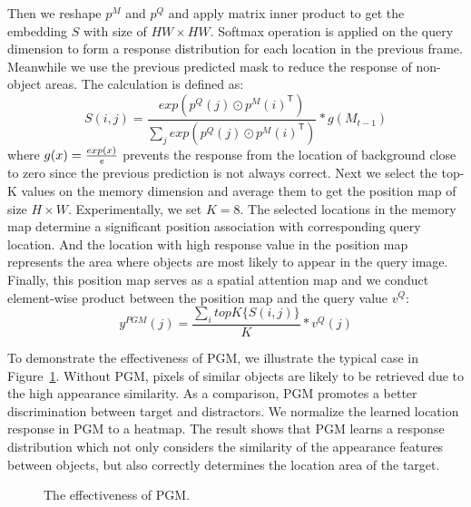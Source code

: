 \documentclass[final]{cvpr}
\begin{document}
Then we reshape $p^{M}$ and $p^{Q}$ and apply matrix inner product to get the embedding $S$ with size of $HW{\times}HW$. Softmax operation is applied on the query dimension to form a response distribution for each location in the previous frame. Meanwhile we use the previous predicted mask to reduce the response of non-object areas. The calculation is defined as:
\begin{equation}
S(i,j)=\frac{exp(p^{Q}(j){\odot}{p^{M}(i)^\mathsf{T}})}{\sum_{j}exp(p^{Q}(j){\odot}{p^{M}(i)^\mathsf{T}})}{\ast}g(M_{t-1})
\end{equation}
where $g(x)=\frac{exp(x)}{\emph{e}}$ prevents the response from the location of background close to zero since the previous prediction is not always correct. Next we select the top-K values on the memory dimension and average them to get the position map of size $H{\times}W$. Experimentally, we set $K=8$. The selected locations in the memory map determine a significant position association with corresponding query location. And the location with high response value in the position map represents the area where objects are most likely to appear in the query image. Finally, this position map serves as a spatial attention map and we conduct element-wise product between the position map and the query value $v^{Q}$:
\begin{equation}
y^{PGM}(j)=\frac{\sum_{i}{topK\{S(i,j)\}}}{K}{\ast}v^{Q}(j)
\end{equation}

To demonstrate the effectiveness of PGM, we illustrate the typical case in Figure~\ref{fig:posv}. Without PGM, pixels of similar objects are likely to be retrieved due to the high appearance similarity. As a comparison, PGM promotes a better discrimination between target and distractors.
We normalize the learned location response in PGM to a heatmap. The result shows that PGM learns a response distribution which not only considers the similarity of the appearance features between objects, but also correctly determines the location area of the target.




\begin{figure}[!t]
\begin{center}
	\setlength{\fboxrule}{0pt}
\end{center}
\vspace{-0.3cm}
\caption{The effectiveness of PGM.}
\label{fig:posv}
\end{figure}
\end{document}
